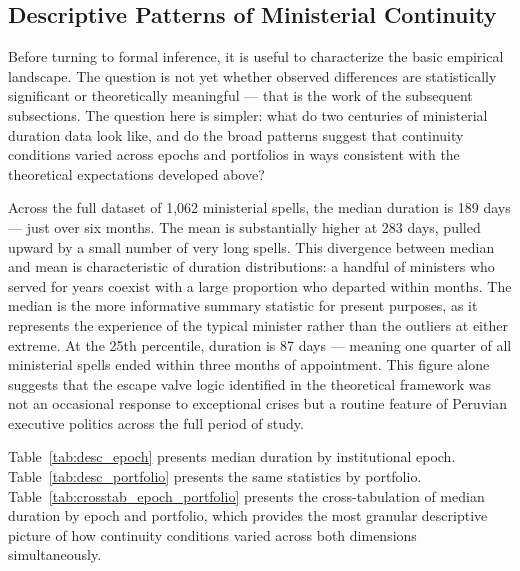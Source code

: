 \documentclass[doc, 12pt, a4paper,floatsintext]{apa7}
\begin{document}
\subsection{Descriptive Patterns of Ministerial Continuity}

Before turning to formal inference, it is useful to characterize the 
basic empirical landscape. The question is not yet whether observed 
differences are statistically significant or theoretically meaningful 
--- that is the work of the subsequent subsections. The question here 
is simpler: what do two centuries of ministerial duration data look 
like, and do the broad patterns suggest that continuity conditions 
varied across epochs and portfolios in ways consistent with the 
theoretical expectations developed above?

Across the full dataset of 1,062 ministerial spells, the median 
duration is 189 days --- just over six months. The mean is 
substantially higher at 283 days, pulled upward by a small number 
of very long spells. This divergence between median and mean is 
characteristic of duration distributions: a handful of ministers 
who served for years coexist with a large proportion who departed 
within months. The median is the more informative summary statistic 
for present purposes, as it represents the experience of the typical 
minister rather than the outliers at either extreme. At the 25th 
percentile, duration is 87 days --- meaning one quarter of all 
ministerial spells ended within three months of appointment. This 
figure alone suggests that the escape valve logic identified in the 
theoretical framework was not an occasional response to exceptional 
crises but a routine feature of Peruvian executive politics across 
the full period of study.

Table~\ref{tab:desc_epoch} presents median duration by institutional 
epoch. Table~\ref{tab:desc_portfolio} presents the same statistics 
by portfolio. Table~\ref{tab:crosstab_epoch_portfolio} presents the cross-tabulation 
of median duration by epoch and portfolio, which provides the most 
granular descriptive picture of how continuity conditions varied 
across both dimensions simultaneously.
\end{document}
